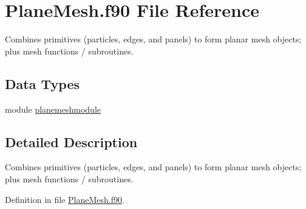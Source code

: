 \hypertarget{_plane_mesh_8f90}{\section{Plane\+Mesh.\+f90 File Reference}
\label{_plane_mesh_8f90}
}


Combines primitives (particles, edges, and panels) to form planar mesh objects; plus mesh functions / subroutines.  


\subsection*{Data Types}
\begin{DoxyCompactItemize}
\item 
module \hyperlink{classplanemeshmodule}{planemeshmodule}
\end{DoxyCompactItemize}


\subsection{Detailed Description}
Combines primitives (particles, edges, and panels) to form planar mesh objects; plus mesh functions / subroutines. 



Definition in file \hyperlink{_plane_mesh_8f90_source}{Plane\+Mesh.\+f90}.

